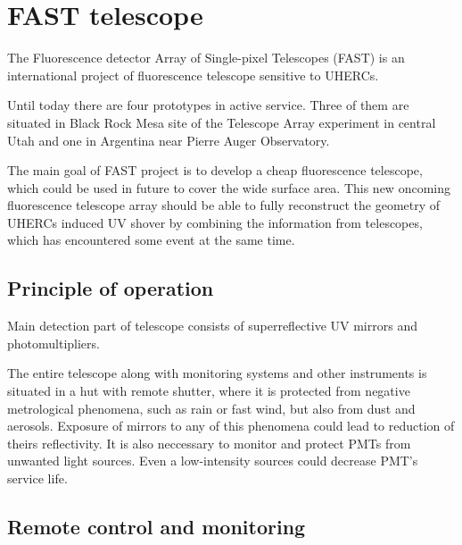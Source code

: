 
\chapter{FAST telescope}
The  Fluorescence  detector  Array  of  Single-pixel  Telescopes  (FAST) is an international project of fluorescence telescope sensitive to UHERCs. 
\par
Until today there are four prototypes in active service. Three of them are situated in Black Rock Mesa site of the Telescope Array experiment in central Utah and one in Argentina near Pierre Auger Observatory.
\par
The main goal of FAST project is to develop a cheap fluorescence telescope, which could be used in future to cover the wide surface area. This new oncoming fluorescence telescope array should be able  
to fully reconstruct the geometry of UHERCs induced UV shover by combining the information from telescopes, which has encountered some event at the same time. 
\section{Principle of operation}
Main detection part of telescope consists of superreflective UV mirrors and photomultipliers. 


\par
The entire telescope along with monitoring systems and other instruments is situated in a hut with remote shutter, where it is protected from negative metrological phenomena, such as rain or fast wind, but also from dust and aerosols. Exposure of mirrors to any of this phenomena could lead to reduction of theirs reflectivity. It is also neccessary to monitor and protect PMTs from unwanted light sources. Even a low-intensity sources could decrease PMT's service life.

\section{Remote control and monitoring}


\section{}



